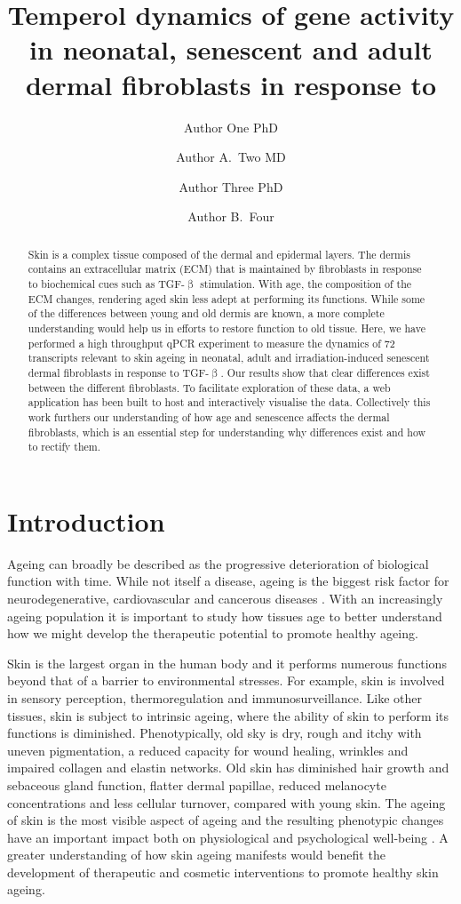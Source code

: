 \documentclass[alpha-refs]{wiley-article}
\title{Temperol dynamics of gene activity in neonatal, senescent and adult dermal fibroblasts in response to \tgf{}}
\author[1\authfn{1}]{Author One PhD}
\author[2\authfn{1}]{Author A.~Two MD}
\author[2\authfn{2}]{Author Three PhD}
\author[2]{Author B.~Four}
\affil[1]{Institute for Cell and Molecular Biosciences, Newcastle University, Newcastle, Tyne-and-Wear, NE1 7RU, UK}
\affil[2]{Department of Biosciences, Durham University, Durham, County Durham, DH1 3LE, UK}
\affil[3]{Procter \& Gamble, Cincinnati, OH 45202, USA}
\newcommand{\tgf}{TGF-$\upbeta$}
\begin{document}
\maketitle

\begin{abstract}
Skin is a complex tissue composed of the dermal and epidermal layers. The dermis contains an extracellular matrix (ECM) that is maintained by fibroblasts in response to biochemical cues such as \tgf{} stimulation. With age, the composition of the ECM changes, rendering aged skin less adept at performing its functions. While some of the differences between young and old dermis are known, a more complete understanding would help us in efforts to restore function to old tissue. Here, we have performed a high throughput qPCR experiment to measure the dynamics of 72 transcripts relevant to skin ageing in neonatal, adult and irradiation-induced senescent dermal fibroblasts in response to \tgf{}. Our results show that clear differences exist between the different fibroblasts. To facilitate exploration of these data, a web application has been built to host and interactively visualise the data. Collectively this work furthers our understanding of how age and senescence affects the dermal fibroblasts, which is an essential step for understanding why differences exist and how to rectify them.

\keywords{Skin, Ageing, Dermal fibroblasts, High throughput qPCR, \tgf{}}
\end{abstract}

\section{Introduction}
Ageing can broadly be described as the progressive deterioration of biological function with time. While not itself a disease, ageing is the biggest risk factor for neurodegenerative, cardiovascular and cancerous diseases \citep{Niccoli2012}. With an increasingly ageing population it is important to study how tissues age to better understand how we might develop the therapeutic potential to promote healthy ageing. %

Skin is the largest organ in the human body and it performs numerous functions beyond that of a barrier to environmental stresses. For example, skin is involved in sensory perception, thermoregulation and immunosurveillance. Like other tissues, skin is subject to intrinsic ageing, where the ability of skin to perform its functions is diminished. Phenotypically, old sky is dry, rough and itchy with uneven pigmentation, a reduced capacity for wound healing, wrinkles and impaired collagen and elastin networks. Old skin has diminished hair growth and sebaceous gland function, flatter dermal papillae, reduced melanocyte concentrations and less cellular turnover, compared with young skin. The ageing of skin is the most visible aspect of ageing and the resulting phenotypic changes have an important impact both on physiological and psychological well-being \citep{Blume-Peytavi2016, Farage2009}. A greater understanding of how skin ageing manifests would benefit the development of therapeutic and cosmetic interventions to promote healthy skin ageing. 
\end{document}
